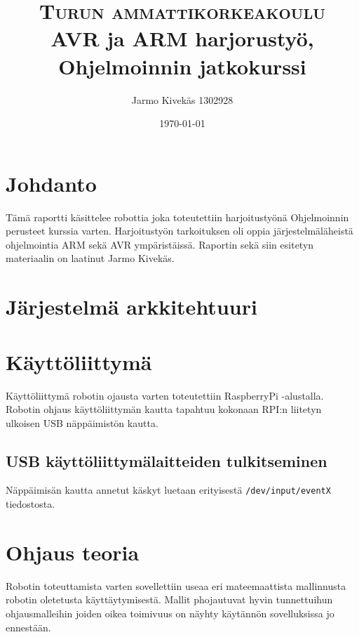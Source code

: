 \documentclass[]{article} %
\title{	
\normalfont \normalsize 
\textsc{Turun ammattikorkeakoulu} \\ [25pt] %
\huge AVR ja ARM harjorustyö, Ohjelmoinnin jatkokurssi\\ %
}
\author{
Jarmo Kivekäs 1302928
}
\date{\normalsize\today} %
\numberwithin{equation}{section}
\numberwithin{figure}{section}
\numberwithin{table}{section}
\begin{document}
\maketitle
\tableofcontents

\newpage












\section{Johdanto}
\label{sec:Johdanto}


Tämä raportti käsittelee robottia joka toteutettiin harjoitustyönä Ohjelmoinnin perusteet kurssia varten.
Harjoitustyön tarkoituksen oli oppia järjestelmäläheistä ohjelmointia ARM sekä AVR ympäristäissä.
Raportin sekä siin esitetyn materiaalin on laatinut Jarmo Kivekäs.


\section{Järjestelmä arkkitehtuuri}
\label{sec:Jarjestelma arkkitehtuuri}

\section{Käyttöliittymä}
\label{sec:Kayttoliittyma}

Käyttöliittymä robotin ojausta varten toteutettiin RaspberryPi -alustalla.
Robotin ohjaus käyttöliittymän kautta tapahtuu kokonaan RPI:n liitetyn ulkoisen USB näppäimistön kautta.

\subsection{USB käyttöliittymälaitteiden tulkitseminen}
\label{sub:USB kayttoliittymalaitteiden tulkitseminen}

Näppäimisän kautta annetut käskyt luetaan erityisestä \verb+/dev/input/eventX+ tiedostosta. 

\section{Ohjaus teoria}
\label{sec:Ohjaus teoria}

Robotin toteuttamista varten sovellettiin useaa eri mateemaattista mallinnusta robotin oletetusta käyttäytymisestä.
Mallit phojautuvat hyvin tunnettuihun ohjausmalleihin joiden oikea toimivuus on näyhty käytännön sovelluksissa jo ennestään.
 
\end{document}
